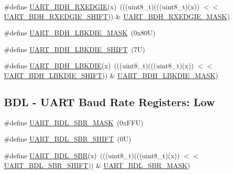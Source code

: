\begin{DoxyCompactItemize}
\item 
\#define \mbox{\hyperlink{group___u_a_r_t___register___masks_ga2f219c309508a7b5a350e2b5cdb1f0bf}{U\+A\+R\+T\+\_\+\+B\+D\+H\+\_\+\+R\+X\+E\+D\+G\+IE}}(x)~(((uint8\+\_\+t)(((uint8\+\_\+t)(x)) $<$$<$ \mbox{\hyperlink{group___u_a_r_t___register___masks_ga97c5d15ae3144492e364744236aa10f7}{U\+A\+R\+T\+\_\+\+B\+D\+H\+\_\+\+R\+X\+E\+D\+G\+I\+E\+\_\+\+S\+H\+I\+FT}})) \& \mbox{\hyperlink{group___u_a_r_t___register___masks_ga0882debd8f2c52d4ab8461b22b6519d9}{U\+A\+R\+T\+\_\+\+B\+D\+H\+\_\+\+R\+X\+E\+D\+G\+I\+E\+\_\+\+M\+A\+SK}})
\item 
\#define \mbox{\hyperlink{group___u_a_r_t___register___masks_ga88fb29d1cb045a09e851a31c689ef60e}{U\+A\+R\+T\+\_\+\+B\+D\+H\+\_\+\+L\+B\+K\+D\+I\+E\+\_\+\+M\+A\+SK}}~(0x80\+U)
\item 
\#define \mbox{\hyperlink{group___u_a_r_t___register___masks_gace1227bd2507a7c5df95398e097cb7af}{U\+A\+R\+T\+\_\+\+B\+D\+H\+\_\+\+L\+B\+K\+D\+I\+E\+\_\+\+S\+H\+I\+FT}}~(7\+U)
\item 
\#define \mbox{\hyperlink{group___u_a_r_t___register___masks_gaf83a19b13a4cc75386904298b32c62a4}{U\+A\+R\+T\+\_\+\+B\+D\+H\+\_\+\+L\+B\+K\+D\+IE}}(x)~(((uint8\+\_\+t)(((uint8\+\_\+t)(x)) $<$$<$ \mbox{\hyperlink{group___u_a_r_t___register___masks_gace1227bd2507a7c5df95398e097cb7af}{U\+A\+R\+T\+\_\+\+B\+D\+H\+\_\+\+L\+B\+K\+D\+I\+E\+\_\+\+S\+H\+I\+FT}})) \& \mbox{\hyperlink{group___u_a_r_t___register___masks_ga88fb29d1cb045a09e851a31c689ef60e}{U\+A\+R\+T\+\_\+\+B\+D\+H\+\_\+\+L\+B\+K\+D\+I\+E\+\_\+\+M\+A\+SK}})
\end{DoxyCompactItemize}
\subsection*{B\+DL -\/ U\+A\+RT Baud Rate Registers\+: Low}
\begin{DoxyCompactItemize}
\item 
\#define \mbox{\hyperlink{group___u_a_r_t___register___masks_ga4471e77a5cfda8db1950aac0b204d964}{U\+A\+R\+T\+\_\+\+B\+D\+L\+\_\+\+S\+B\+R\+\_\+\+M\+A\+SK}}~(0x\+F\+F\+U)
\item 
\#define \mbox{\hyperlink{group___u_a_r_t___register___masks_gad59af590652e14fd8d4a0d46ce48205a}{U\+A\+R\+T\+\_\+\+B\+D\+L\+\_\+\+S\+B\+R\+\_\+\+S\+H\+I\+FT}}~(0\+U)
\item 
\#define \mbox{\hyperlink{group___u_a_r_t___register___masks_ga558b42c8b256ac9201985ce5c618f642}{U\+A\+R\+T\+\_\+\+B\+D\+L\+\_\+\+S\+BR}}(x)~(((uint8\+\_\+t)(((uint8\+\_\+t)(x)) $<$$<$ \mbox{\hyperlink{group___u_a_r_t___register___masks_gad59af590652e14fd8d4a0d46ce48205a}{U\+A\+R\+T\+\_\+\+B\+D\+L\+\_\+\+S\+B\+R\+\_\+\+S\+H\+I\+FT}})) \& \mbox{\hyperlink{group___u_a_r_t___register___masks_ga4471e77a5cfda8db1950aac0b204d964}{U\+A\+R\+T\+\_\+\+B\+D\+L\+\_\+\+S\+B\+R\+\_\+\+M\+A\+SK}})
\end{DoxyCompactItemize}
